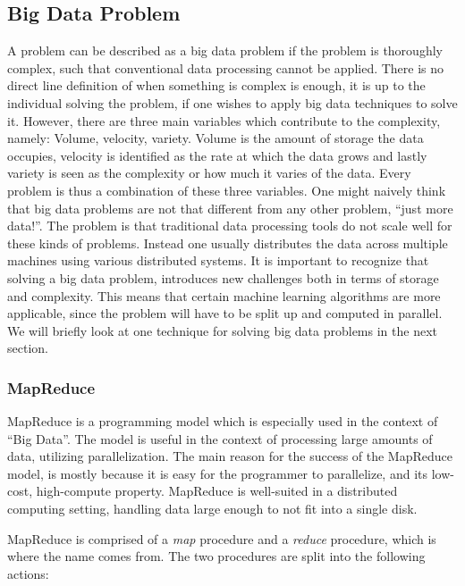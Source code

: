 \subsection{Big Data Problem}
A problem can be described as a big data problem if the problem is thoroughly complex, such that conventional data processing cannot be applied. There is no direct line definition of when something is complex is enough, it is up to the individual solving the problem, if one wishes to apply big data techniques to solve it. However, there are three main variables which contribute to the complexity, namely: Volume, velocity, variety. Volume is the amount of storage the data occupies, velocity is identified as the rate at which the data grows and lastly variety is seen as the complexity or how much it varies of the data. 
Every problem is thus a combination of these three variables. One might naively think that big data problems are not that different from any other problem, ``just more data!''. The problem is that traditional data processing tools do not scale well for these kinds of problems. Instead one usually distributes the data across multiple machines using various distributed systems. It is important to recognize that solving a big data problem, introduces new challenges both in terms of storage and complexity. This means that certain machine learning algorithms are more applicable, since the problem will have to be split up and computed in parallel. We will briefly look at one technique for solving big data problems in the next section.

\subsubsection{MapReduce} %
\label{sec:mapreduce_programming_model}

MapReduce is a programming model which is especially used in the context of ``Big Data''. The model is useful in the context of processing large amounts of data, utilizing parallelization. The main reason for the success of the MapReduce model, is mostly because it is easy for the programmer to parallelize, and its low-cost, high-compute property. MapReduce is well-suited in a distributed computing setting, handling data large enough to not fit into a single disk.

MapReduce is comprised of a \emph{map} procedure and a \emph{reduce} procedure, which is where the name comes from. The two procedures are split into the following actions:


